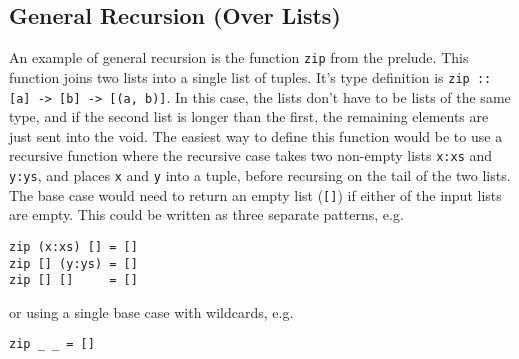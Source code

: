 \subsection*{General Recursion (Over Lists)}

An example of general recursion is the function \verb`zip` from the prelude. This function joins two lists into a
 single list of tuples. It's type definition is \verb`zip :: [a] -> [b] -> [(a, b)]`. In this case, the lists don't
 have to be lists of the same type, and if the second list is longer than the first, the remaining elements are just
 sent into the void. The easiest way to define this function would be to use a recursive function where the recursive
 case takes two non-empty lists \verb`x:xs` and \verb`y:ys`, and places \verb`x` and \verb`y` into a tuple, before
 recursing on the tail of the two lists. The base case would need to return an empty list (\verb`[]`) if either of the
 input lists are empty. This could be written as three separate patterns, e.g.
\begin{verbatim}
zip (x:xs) [] = []
zip [] (y:ys) = []
zip [] []     = []
\end{verbatim}
or using a single base case with wildcards, e.g.
\begin{verbatim}
zip _ _ = []
\end{verbatim}